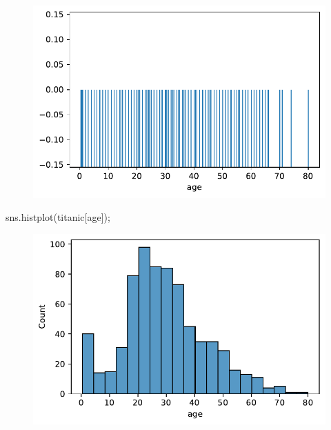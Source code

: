 \documentclass[
  letterpaper,
  DIV=11,
  numbers=noendperiod]{scrreprt}
\newenvironment{Shaded}{\begin{snugshade}}{\end{snugshade}}
\newcommand{\NormalTok}[1]{\textcolor[rgb]{0.00,0.23,0.31}{#1}}
\newcommand{\OperatorTok}[1]{\textcolor[rgb]{0.37,0.37,0.37}{#1}}
\newcommand{\StringTok}[1]{\textcolor[rgb]{0.13,0.47,0.30}{#1}}
\begin{document}
\begin{figure}[H]

{\centering \includegraphics{visualization_2/visualization_2_files/figure-pdf/cell-2-output-1.pdf}

}

\end{figure}

\begin{Shaded}
\begin{Highlighting}[]
\NormalTok{sns.histplot(titanic[}\StringTok{\textquotesingle{}age\textquotesingle{}}\NormalTok{])}\OperatorTok{;}
\end{Highlighting}
\end{Shaded}

\begin{figure}[H]

{\centering \includegraphics{visualization_2/visualization_2_files/figure-pdf/cell-3-output-1.pdf}

}

\end{figure}
\end{document}
